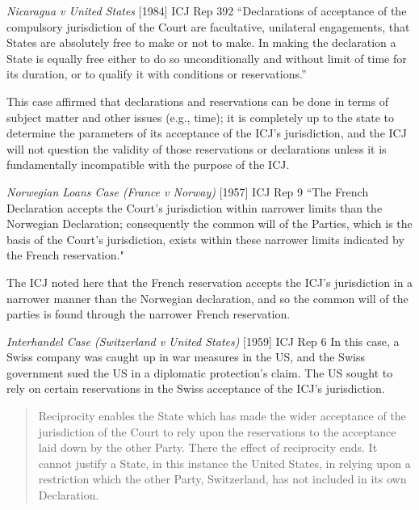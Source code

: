 \begin{casedetails}{\textit{Nicaragua v United States} [1984] ICJ Rep 392}
    \flushleft
    ``Declarations of acceptance of the compulsory jurisdiction of the Court are facultative, unilateral engagements, that States are absolutely free to make or not to make. In making the declaration a State is equally free either to do so unconditionally and without limit of time for its duration, or to qualify it with conditions or reservations.''

    \vspace{\baselineskip}

    This case affirmed that declarations and reservations can be done in terms of subject matter and other issues (e.g., time); it is completely up to the state to determine the parameters of its acceptance of the ICJ's jurisdiction, and the ICJ will not question the validity of those reservations or declarations unless it is fundamentally incompatible with the purpose of the ICJ.
\end{casedetails}

\begin{casedetails}{\textit{Norwegian Loans Case (France v Norway)} [1957] ICJ Rep 9}
    \flushleft
    ``The French Declaration accepts the Court's jurisdiction within narrower limits than the Norwegian Declaration; consequently the common will of the Parties, which is the basis of the Court's jurisdiction, exists within these narrower limits indicated by the French reservation."

    \vspace{\baselineskip}

    The ICJ noted here that the French reservation accepts the ICJ's jurisdiction in a narrower manner than the Norwegian declaration, and so the common will of the parties is found through the narrower French reservation.
\end{casedetails}

\begin{casedetails}{\textit{Interhandel Case (Switzerland v United States)} [1959] ICJ Rep 6}
    \flushleft
    In this case, a Swiss company was caught up in war measures in the US, and the Swiss government sued the US in a diplomatic protection's claim. The US sought to rely on certain reservations in the Swiss acceptance of the ICJ's jurisdiction.

    \begin{quote}
        Reciprocity enables the State which has made the wider acceptance of the jurisdiction of the Court to rely upon the reservations to the acceptance laid down by the other Party. There the effect of reciprocity ends. It cannot justify a State, in this instance the United States, in relying upon a restriction which the other Party, Switzerland, has not included in its own Declaration.
    \end{quote}
\end{casedetails}

